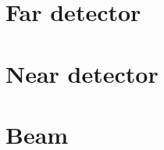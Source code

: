 


\section{Far detector}
\label{sec:dune:fd}


\blindtext

\section{Near detector}
\label{sec:dune:nd}

\blindtext

\section{Beam}
\label{sec:dune:beam}

\blindtext
